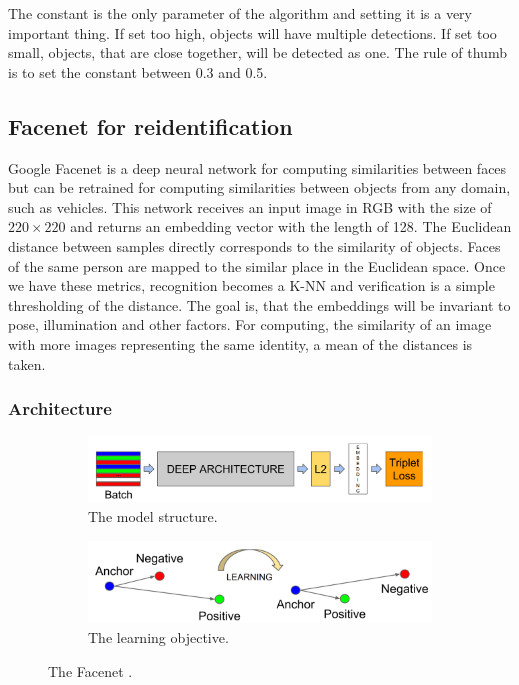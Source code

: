 \documentclass[a4paper,11pt,titlepage,twoside]{article}
\numberwithin{figure}{section}
\begin{document}
The constant is the only parameter of the algorithm and setting it is a very important thing. If set too high, objects will have multiple detections. If set too small, objects, that are close together, will be detected as one. The rule of thumb is to set the constant between 0.3 and 0.5.


\subsection{Facenet for reidentification}
\label{sec:facenet}
Google Facenet \cite{schroff2015facenet} is a deep neural network for computing similarities between faces but can be retrained for computing similarities between objects from any domain, such as vehicles. This network receives an input image in RGB with the size of $220 \times 220$ and returns an embedding vector with the length of 128. The Euclidean distance between samples directly corresponds to the similarity of objects. Faces of the same person are mapped to the similar place in the Euclidean space. Once we have these metrics, recognition becomes a K-NN and verification is a simple thresholding of the distance. The goal is, that the embeddings will be invariant to pose, illumination and other factors. For computing, the similarity of an image with more images representing the same identity, a mean of the distances is taken.

\subsubsection{Architecture}
\begin{figure}
    \begin{subfigure}[Sample1]{0.5\linewidth}
        \includegraphics[width=0.95\linewidth]{fig/facenet.png} 
        \caption{The model structure.}
        \label{fig:facenet_structure}
    \end{subfigure}
    \quad
    \begin{subfigure}[Sample1]{0.5\linewidth} 
        \includegraphics[width=0.95\linewidth]{fig/triplet_loss.png}
        \caption{The learning objective.}   
        \label{fig:triplet_loss}
    \end{subfigure}
    \caption{The Facenet \cite{schroff2015facenet}.}
\end{figure}
\end{document}
